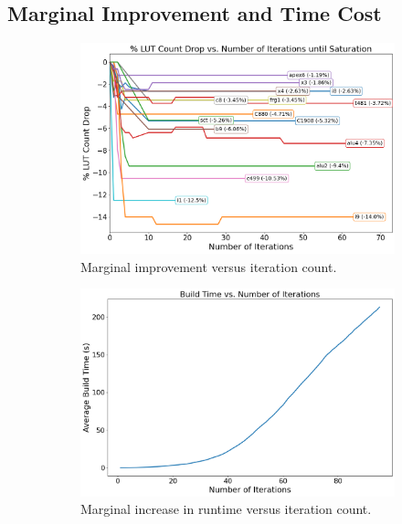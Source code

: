 \subsection{Marginal Improvement and Time Cost}\label{sec:results:margin}
\begin{figure}
    \begin{subfigure}{0.47\textwidth}
        \centering
        \includegraphics[width=\textwidth]{img/improvement.png}
        \caption{Marginal improvement versus iteration count.}\label{fig:marginal:improvement}
        \Description[]{}
    \end{subfigure}
    \hfill\vspace{4mm}
    \begin{subfigure}{0.47\textwidth}
        \centering
        \includegraphics[width=\textwidth]{img/runtime.png}
        \caption{Marginal increase in runtime versus iteration count.}\label{fig:marginal:runtime}
        \Description[]{}
    \end{subfigure}
    \caption{}\label{fig:marginal}
    \Description[]{}
\end{figure}

